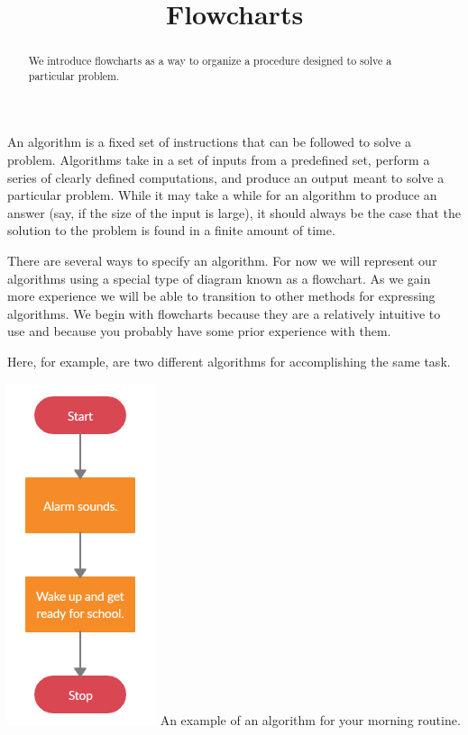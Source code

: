 \documentclass{ximera}
\title{Flowcharts}
\begin{document}
  
\begin{abstract}  
We introduce flowcharts as a way to organize a procedure designed to solve a particular problem.
\end{abstract}  
\maketitle

An algorithm is a fixed set of instructions that can be followed to solve a problem. Algorithms take in a set of inputs from a predefined set, perform a series of clearly defined computations, and produce an output meant to solve a particular problem. While it may take a while for an algorithm to produce an answer (say, if the size of the input is large), it should always be the case that the solution to the problem is found in a finite amount of time.

There are several ways to specify an algorithm. For now we will represent our algorithms using a special type of diagram known as a flowchart. As we gain more experience we will be able to transition to other methods for expressing algorithms. We begin with flowcharts because they are a relatively intuitive to use and because you probably have some prior experience with them.

Here, for example, are two different algorithms for accomplishing the same task. 

\begin{center}
	\includegraphics{morning1.png}
	An example of an algorithm for your morning routine.
\end{center}
\end{document}
